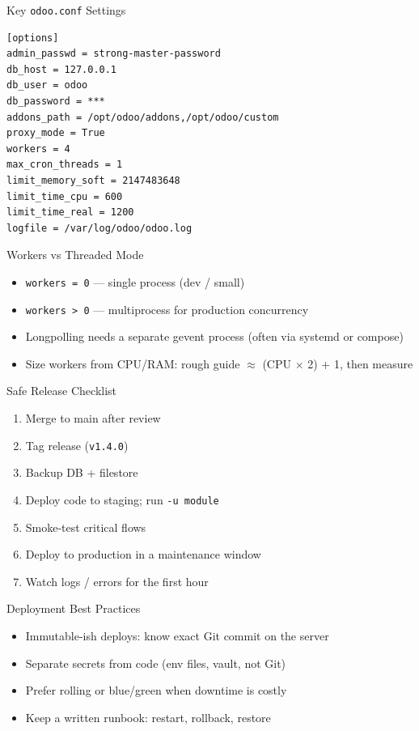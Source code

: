 \begin{frame}[fragile]{Key \texttt{odoo.conf} Settings}
\begin{lstlisting}[language={}]
[options]
admin_passwd = strong-master-password
db_host = 127.0.0.1
db_user = odoo
db_password = ***
addons_path = /opt/odoo/addons,/opt/odoo/custom
proxy_mode = True
workers = 4
max_cron_threads = 1
limit_memory_soft = 2147483648
limit_time_cpu = 600
limit_time_real = 1200
logfile = /var/log/odoo/odoo.log
\end{lstlisting}
\end{frame}

\begin{frame}{Workers vs Threaded Mode}
\begin{itemize}
  \item \texttt{workers = 0} --- single process (dev / small)
  \item \texttt{workers > 0} --- multiprocess for production concurrency
  \item Longpolling needs a separate gevent process (often via systemd or compose)
  \item Size workers from CPU/RAM: rough guide $\approx$ (CPU $\times$ 2) + 1, then measure
\end{itemize}
\end{frame}

\begin{frame}[fragile]{Safe Release Checklist}
\begin{enumerate}
  \item Merge to main after review
  \item Tag release (\texttt{v1.4.0})
  \item Backup DB + filestore
  \item Deploy code to staging; run \texttt{-u module}
  \item Smoke-test critical flows
  \item Deploy to production in a maintenance window
  \item Watch logs / errors for the first hour
\end{enumerate}
\end{frame}

\begin{frame}{Deployment Best Practices}
\begin{itemize}
  \item Immutable-ish deploys: know exact Git commit on the server
  \item Separate secrets from code (env files, vault, not Git)
  \item Prefer rolling or blue/green when downtime is costly
  \item Keep a written runbook: restart, rollback, restore
\end{itemize}
\end{frame}
